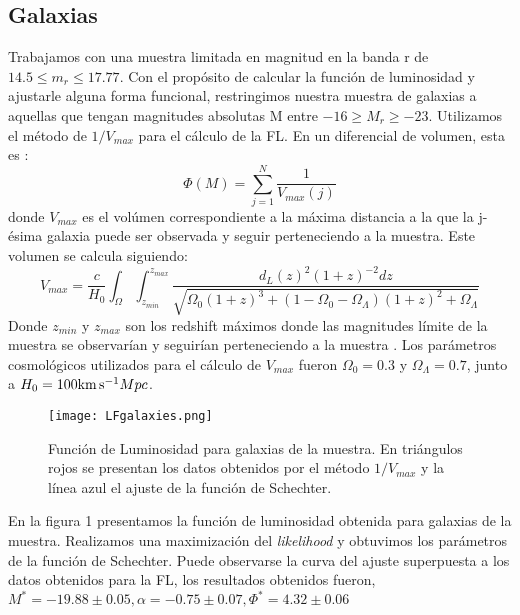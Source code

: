 \documentclass[a4paper,10pt]{article}
\newcommand{\kms}{{\rm km\,s^{-1}}}
\begin{document}
\subsection{Galaxias}
Trabajamos con una muestra limitada en magnitud en la banda r de $14.5 \leq m_{r} \leq17.77$.
Con el prop\'osito de calcular la funci\'on de luminosidad y ajustarle alguna forma funcional, restringimos nuestra muestra de galaxias a aquellas que tengan magnitudes absolutas M entre $-16 \geq M_{r} \geq -23 $. Utilizamos el m\'etodo de $1/V_{max}$ para el c\'alculo de la FL. En un diferencial de volumen, esta es :
\begin{equation}
 \Phi(M)=\sum_{j=1}^{N}\frac{1}{V_{max}(j)}
\end{equation}
donde $V_{max}$ es el vol\'umen correspondiente a la m\'axima distancia a la que la j-\'esima galaxia puede ser observada y seguir perteneciendo a la muestra. Este volumen se calcula siguiendo: 
\begin{equation}
 V_{max}=\frac{c}{H_{0}} \int_{\Omega}\int_{z_{min}}^{z_{max}}\frac{d_{L}(z)^{2}(1+z)^{-2}dz}{\sqrt{\Omega_{0}(1+z)^{3}+(1-\Omega_{0}-\Omega_{\Lambda})(1+z)^{2}+\Omega_{\Lambda}}} 
\end{equation}
Donde $z_{min}$ y $z_{max}$ son los redshift m\'aximos donde las magnitudes l\'imite de la muestra se observar\'ian y seguir\'ian perteneciendo a la muestra
\citep{Willmer1997}. Los par\'ametros cosmol\'ogicos utilizados para el c\'alculo de $V_{max}$ fueron $\Omega_{0}=0.3$ y $\Omega_{\Lambda}=0.7$, junto a $H_{0}=100\kms Mpc$.
\begin{figure}[h]
 \centering
 \texttt{[image: LFgalaxies.png]}
 \caption{Funci\'on de Luminosidad para galaxias de la muestra. En tri\'angulos rojos se presentan los datos obtenidos por el m\'etodo $1/V_{max}$ y la l\'inea azul el ajuste de la funci\'on de Schechter.}
 \label{fig:1}
\end{figure}

En la figura 1 presentamos la funci\'on de luminosidad obtenida para galaxias de la muestra. Realizamos una maximizaci\'on del \textit{likelihood} y obtuvimos los par\'ametros de la funci\'on de Schechter. Puede observarse la curva del ajuste superpuesta a los datos obtenidos para la FL, los resultados obtenidos fueron, $ M^{\ast}=-19.88\pm0.05, \alpha=-0.75\pm0.07, \Phi^{\ast}=4.32\pm0.06 $
\end{document}
